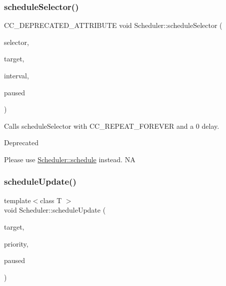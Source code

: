 \subsubsection{\texorpdfstring{schedule\+Selector()}{scheduleSelector()}\hspace{0.1cm}{\footnotesize\ttfamily [4/4]}}
{\footnotesize\ttfamily C\+C\+\_\+\+D\+E\+P\+R\+E\+C\+A\+T\+E\+D\+\_\+\+A\+T\+T\+R\+I\+B\+U\+TE void Scheduler\+::schedule\+Selector (\begin{DoxyParamCaption}\item[{S\+E\+L\+\_\+\+S\+C\+H\+E\+D\+U\+LE}]{selector,  }\item[{\hyperlink{classRef}{Ref} $\ast$}]{target,  }\item[{float}]{interval,  }\item[{bool}]{paused }\end{DoxyParamCaption})\hspace{0.3cm}{\ttfamily [inline]}}

Calls schedule\+Selector with C\+C\+\_\+\+R\+E\+P\+E\+A\+T\+\_\+\+F\+O\+R\+E\+V\+ER and a 0 delay. \begin{DoxyRefDesc}{Deprecated}
\item[\hyperlink{deprecated__deprecated000290}{Deprecated}]Please use {\ttfamily \hyperlink{classScheduler_a0d52145629a67e888cf1b25fd01f668b}{Scheduler\+::schedule}} instead.  NA \end{DoxyRefDesc}
\mbox{\label{classScheduler_ad566d55a4941459c185e6faeddc3a70f}} 
\subsubsection{\texorpdfstring{schedule\+Update()}{scheduleUpdate()}\hspace{0.1cm}{\footnotesize\ttfamily [1/2]}}
{\footnotesize\ttfamily template$<$class T $>$ \\
void Scheduler\+::schedule\+Update (\begin{DoxyParamCaption}\item[{T $\ast$}]{target,  }\item[{int}]{priority,  }\item[{bool}]{paused }\end{DoxyParamCaption})\hspace{0.3cm}{\ttfamily [inline]}}

